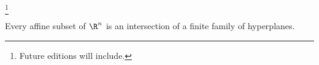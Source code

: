 
  \ifhmode\unskip\fi\footnote{
Future editions will include.
  }

\begin{proposition}
Every affine subset of $\R^n$ is an intersection of a finite family of hyperplanes.
\end{proposition}

\blankpage
